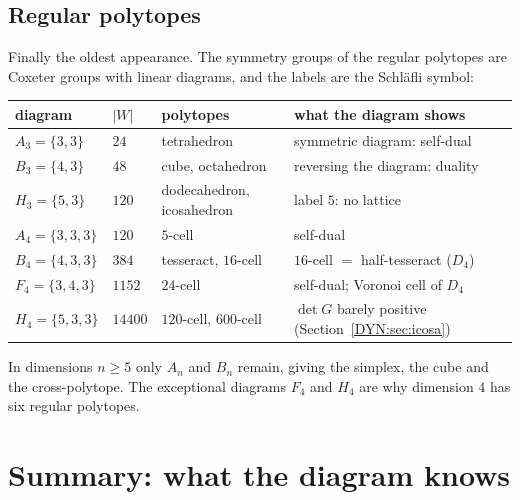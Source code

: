 \documentclass[11pt,openany]{book}
\theoremstyle{plain}
\theoremstyle{definition}
\theoremstyle{remark}
\newcommand{\abs}[1]{\left\lvert #1 \right\rvert}
\begin{document}
\subsection*{Regular polytopes}
Finally the oldest appearance. The symmetry groups of the regular polytopes are Coxeter groups with
linear diagrams, and the labels are the Schl\"afli symbol:
\begin{center}
\renewcommand{\arraystretch}{1.15}
\begin{tabular}{llll}
\toprule
diagram & $\abs W$ & polytopes & what the diagram shows\\
\midrule
$A_3=\{3,3\}$ & $24$ & tetrahedron & symmetric diagram: self-dual\\
$B_3=\{4,3\}$ & $48$ & cube, octahedron & reversing the diagram: duality\\
$H_3=\{5,3\}$ & $120$ & dodecahedron, icosahedron & label $5$: no lattice\\
$A_4=\{3,3,3\}$ & $120$ & $5$-cell & self-dual\\
$B_4=\{4,3,3\}$ & $384$ & tesseract, $16$-cell & $16$-cell $=$ half-tesseract ($D_4$)\\
$F_4=\{3,4,3\}$ & $1152$ & $24$-cell & self-dual; Voronoi cell of $D_4$\\
$H_4=\{5,3,3\}$ & $14400$ & $120$-cell, $600$-cell & $\det G$ barely positive (Section~\ref{DYN:sec:icosa})\\
\bottomrule
\end{tabular}
\end{center}
In dimensions $n\ge5$ only $A_n$ and $B_n$ remain, giving the simplex, the cube and the cross-polytope.
The exceptional diagrams $F_4$ and $H_4$ are why dimension $4$ has six regular polytopes.

\section{Summary: what the diagram knows}
\label{DYN:sec:summary}
\end{document}

